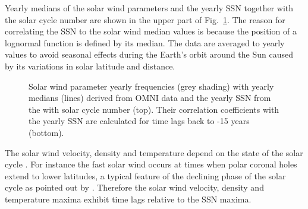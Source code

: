 \documentclass[]{aa}
\begin{document}
	Yearly medians of the solar wind parameters and the yearly SSN together with the solar cycle number are shown in the upper part of Fig.~\ref{fig:OMNI_yearly_ssn_correlation_c_plot}. The reason for correlating the SSN to the solar wind median values is because the position of a lognormal function is defined by its median. The data are averaged to yearly values to avoid seasonal effects during the Earth’s orbit around the Sun caused by its variations in solar latitude and distance.
	\begin{figure}
		\caption{Solar wind parameter yearly frequencies (grey shading) with yearly medians (lines) derived from OMNI data and the yearly SSN from the \citet{sidc} with solar cycle number (top). Their correlation coefficients with the yearly SSN are calculated for time lags back to -15 years (bottom).}
		\label{fig:OMNI_yearly_ssn_correlation_c_plot}
	\end{figure}
	The solar wind velocity, density and temperature depend on the state of the solar cycle \citep{Schwenn1983}.
	For instance the fast solar wind occurs at times when polar coronal holes extend to lower latitudes, a typical feature of the declining phase of the solar cycle as pointed out by \citet[p.~75, Figure~3.52]{Bothmer2007}. Therefore the solar wind velocity, density and temperature maxima exhibit time lags relative to the SSN maxima.
\end{document}

